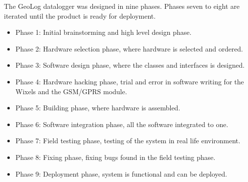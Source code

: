 The GeoLog datalogger was designed in nine phases. Phases seven to eight are iterated
until the product is ready for deployment.
\begin{itemize}
    \item{Phase 1:} Initial brainstorming and high level design phase.
    \item{Phase 2:} Hardware selection phase, where hardware is selected and ordered.
    \item{Phase 3:} Software design phase, where the classes and interfaces is designed.
    \item{Phase 4:} Hardware hacking phase, trial and error in software writing for the
                    Wixels\cite{wixel} and the GSM/GPRS module\cite{SM5100B}.
    \item{Phase 5:} Building phase, where hardware is assembled.
    \item{Phase 6:} Software integration phase, all the software integrated to one.
    \item{Phase 7:} Field testing phase, testing of the system in real life environment.
    \item{Phase 8:} Fixing phase, fixing bugs found in the field testing phase.
    \item{Phase 9:} Deployment phase, system is functional and can be deployed. 
\end{itemize}
